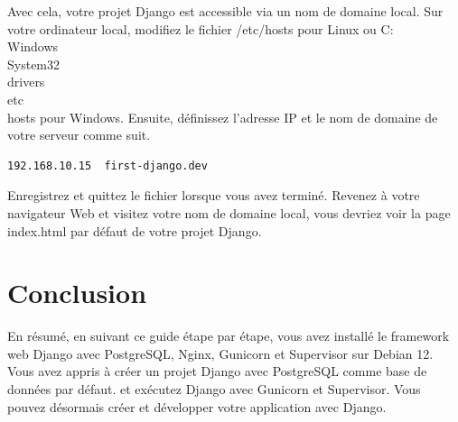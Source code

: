\documentclass{article}
\begin{document}
Avec cela, votre projet Django est accessible via un nom de domaine local.
Sur votre ordinateur local, modifiez le fichier /etc/hosts pour Linux ou C:\\Windows\\System32\\drivers\\etc\\hosts pour Windows. Ensuite, définissez l'adresse IP et le nom de domaine de votre serveur comme suit.

\begin{verbatim}
192.168.10.15  first-django.dev
\end{verbatim}

Enregistrez et quittez le fichier lorsque vous avez terminé.
Revenez à votre navigateur Web et visitez votre nom de domaine local, vous devriez voir la page index.html par défaut de votre projet Django.
\section{Conclusion}
En résumé, en suivant ce guide étape par étape, vous avez installé le framework web Django avec PostgreSQL, Nginx, Gunicorn et Supervisor sur Debian 12. Vous avez appris à créer un projet Django avec PostgreSQL comme base de données par défaut. et exécutez Django avec Gunicorn et Supervisor. Vous pouvez désormais créer et développer votre application avec Django.
\end{document}
